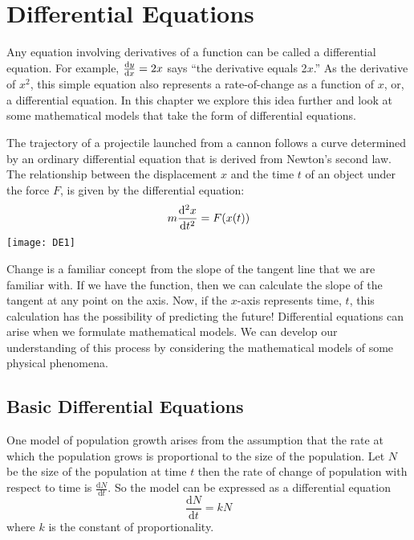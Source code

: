 \chapter{Differential Equations}
Any equation involving derivatives of a function can be called a differential equation.  For example, $ \frac{\mathrm{d}y}{\mathrm{d}x}=2x$ says ``the derivative equals 2$x$.'' As the derivative of $x^2$, this simple equation also represents a rate-of-change as a function of $x$, or, a differential equation. In this chapter we explore this idea further and look at some mathematical models that take the form of differential equations.

\begin{multicols}{2}
The trajectory of a projectile launched from a cannon follows a curve determined by an ordinary differential equation that is derived from Newton's second law. The relationship between the displacement $x$ and the time $t$ of an object under the force $F$, is given by the differential equation: \[ m\frac{\mathrm{d}^2x}{\mathrm{d}t^2}=F(x(t)) \]
	 \texttt{[image: DE1]}
\end{multicols}
Change is a familiar concept from the slope of the tangent line that we are familiar with. If we have the function, then we can calculate the slope of the tangent at any point on the axis. Now, if the $x$-axis represents time, $t$, this calculation has the possibility of predicting the future! Differential equations can arise when we formulate mathematical models.  We can develop our understanding of this process by considering the mathematical models of some physical phenomena. 



\section{Basic Differential Equations}
One model of population growth arises from the assumption that the rate at which the population grows is proportional to the size of the population.
Let $N$ be the size of the population at time $t$ then the rate of change of population with respect to time is $\frac{\mathrm{d} N}{\mathrm{d} t}\text{.}$  So the model can be expressed as a differential equation
\begin{equation*}\frac{\mathrm{d} N}{\mathrm{d} t} =k N
\end{equation*}
where $k$ is the constant of proportionality. 

